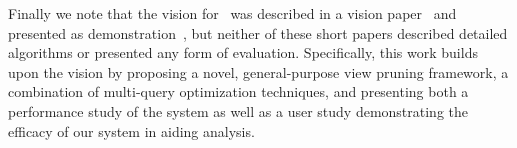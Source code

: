 \noindent Finally we note that the vision for \SeeDB\ was described in a vision paper~\cite{DBLP:conf/vldb/Parameswaran2013} and presented as demonstration~\cite{DBLP:journals/pvldb/VartakMPP14}, but neither of these short papers described detailed algorithms or
presented any form of evaluation.
Specifically, this work builds upon the \SeeDB vision by proposing a novel, general-purpose view 
pruning framework, a combination of multi-query optimization techniques, and presenting 
both a performance study of the system as well as a user study demonstrating the efficacy of our system in aiding analysis.



